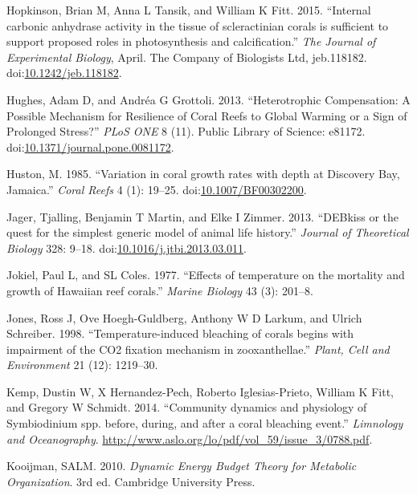 \documentclass[]{elsarticle} %
\begin{document}
\hypertarget{ref-Hopkinson:2015ev}{}
Hopkinson, Brian M, Anna L Tansik, and William K Fitt. 2015. ``Internal
carbonic anhydrase activity in the tissue of scleractinian corals is
sufficient to support proposed roles in photosynthesis and
calcification.'' \emph{The Journal of Experimental Biology}, April. The
Company of Biologists Ltd, jeb.118182.
doi:\href{https://doi.org/10.1242/jeb.118182}{10.1242/jeb.118182}.

\hypertarget{ref-Hughes:2013hd}{}
Hughes, Adam D, and Andréa G Grottoli. 2013. ``Heterotrophic
Compensation: A Possible Mechanism for Resilience of Coral Reefs to
Global Warming or a Sign of Prolonged Stress?'' \emph{PLoS ONE} 8 (11).
Public Library of Science: e81172.
doi:\href{https://doi.org/10.1371/journal.pone.0081172}{10.1371/journal.pone.0081172}.

\hypertarget{ref-Huston:1985ec}{}
Huston, M. 1985. ``Variation in coral growth rates with depth at
Discovery Bay, Jamaica.'' \emph{Coral Reefs} 4 (1): 19--25.
doi:\href{https://doi.org/10.1007/BF00302200}{10.1007/BF00302200}.

\hypertarget{ref-Jager:2013bj}{}
Jager, Tjalling, Benjamin T Martin, and Elke I Zimmer. 2013. ``DEBkiss
or the quest for the simplest generic model of animal life history.''
\emph{Journal of Theoretical Biology} 328: 9--18.
doi:\href{https://doi.org/10.1016/j.jtbi.2013.03.011}{10.1016/j.jtbi.2013.03.011}.

\hypertarget{ref-Jokiel:1977p7353}{}
Jokiel, Paul L, and SL Coles. 1977. ``Effects of temperature on the
mortality and growth of Hawaiian reef corals.'' \emph{Marine Biology} 43
(3): 201--8.

\hypertarget{ref-Jones:1998p3572}{}
Jones, Ross J, Ove Hoegh-Guldberg, Anthony W D Larkum, and Ulrich
Schreiber. 1998. ``Temperature-induced bleaching of corals begins with
impairment of the CO2 fixation mechanism in zooxanthellae.''
\emph{Plant, Cell and Environment} 21 (12): 1219--30.

\hypertarget{ref-Kemp:2014ug}{}
Kemp, Dustin W, X Hernandez-Pech, Roberto Iglesias-Prieto, William K
Fitt, and Gregory W Schmidt. 2014. ``Community dynamics and physiology
of Symbiodinium spp. before, during, and after a coral bleaching
event.'' \emph{Limnology and Oceanography}.
\url{http://www.aslo.org/lo/pdf/vol_59/issue_3/0788.pdf}.

\hypertarget{ref-Kooijman:2010vd}{}
Kooijman, SALM. 2010. \emph{Dynamic Energy Budget Theory for Metabolic
Organization}. 3rd ed. Cambridge University Press.
\end{document}
